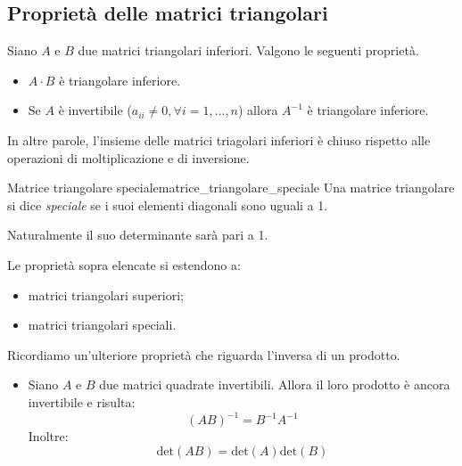 \documentclass[12pt]{report}
\newcounter{definition}
\newcommand{\nmu}{}
\begin{document}
\subsection{Proprietà delle matrici triangolari}
Siano $A$ e $B$ due matrici triangolari inferiori. Valgono le seguenti proprietà.
\begin{itemize}
	\item $A \cdot B$ è triangolare inferiore.
	\item Se $A$ è invertibile ($a_{ii} \neq 0, \forall i = 1, \dots, n$) allora $A^{-1}$ è triangolare inferiore.
\end{itemize}
\begin{note}{}{}
In altre parole, l'insieme delle matrici triagolari inferiori è chiuso rispetto alle operazioni di moltiplicazione e di inversione.
\end{note}
\begin{definition}{\nmu Matrice triangolare speciale}{matrice_triangolare_speciale}
	Una matrice triangolare si dice \textit{speciale} se i suoi elementi diagonali sono uguali a 1.
\end{definition}
Naturalmente il suo determinante sarà pari a 1.

Le proprietà sopra elencate si estendono a:
\begin{itemize}
	\item matrici triangolari superiori;
	\item matrici triangolari speciali.
\end{itemize}
Ricordiamo un'ulteriore proprietà che riguarda l'inversa di un prodotto.
\begin{itemize}
	\item Siano $A$ e $B$ due matrici quadrate invertibili. Allora il loro prodotto è ancora invertibile e risulta:
	\[
	(AB)^{-1} = B^{-1}A^{-1}
	\]
	Inoltre:
	\[
	\text{det}(AB) = \text{det}(A)\text{det}(B)
	\]
\end{itemize}
\end{document}
